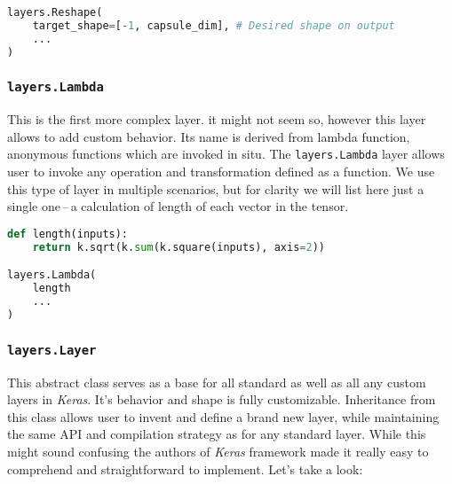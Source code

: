\begin{lstlisting}[language=Python, caption=Reshape layer]
layers.Reshape(
    target_shape=[-1, capsule_dim], # Desired shape on output
    ...
)
\end{lstlisting}

\subsubsection{\texttt{layers.Lambda}}

This is the first more complex layer. it might not seem so, however this layer allows to add custom behavior. Its name is derived from lambda function, anonymous functions which are invoked in situ. The \texttt{layers.Lambda} layer allows user to invoke any operation and transformation defined as a function. We use this type of layer in multiple scenarios, but for clarity we will list here just a single one\,--\,a calculation of length of each vector in the tensor.

\begin{lstlisting}[language=Python, caption=Lambda layer]
def length(inputs):
    return k.sqrt(k.sum(k.square(inputs), axis=2))

layers.Lambda(
    length
    ...
)
\end{lstlisting}


\subsubsection{\texttt{layers.Layer}}

This abstract class serves as a base for all standard as well as all any custom layers in \textit{Keras}. It's behavior and shape is fully customizable. Inheritance from this class allows user to invent and define a brand new layer, while maintaining the same API and compilation strategy as for any standard layer. While this might sound confusing the authors of \textit{Keras} framework made it really easy to comprehend and straightforward to implement. Let's take a look:


